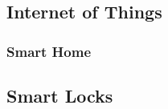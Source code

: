 \subsection{Internet of Things}
\label{sec:iot}
\subsubsection{Smart Home}
\label{sec:smart_home}
\subsection{Smart Locks}
\label{sec:smart_locks}